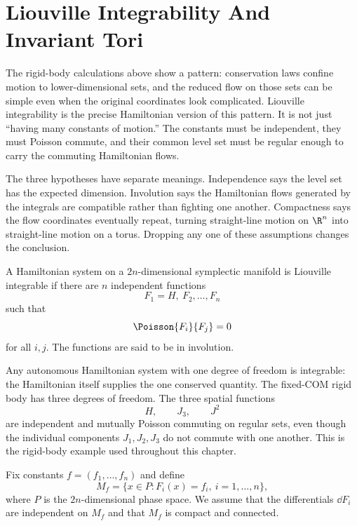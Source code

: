 \section{Liouville Integrability And Invariant Tori}
\label{sec:liouville-tori}

The rigid-body calculations above show a pattern: conservation laws confine
motion to lower-dimensional sets, and the reduced flow on those sets can be
simple even when the original coordinates look complicated. Liouville
integrability is the precise Hamiltonian version of this pattern. It is not
just ``having many constants of motion.'' The constants must be independent,
they must Poisson commute, and their common level set must be regular enough to
carry the commuting Hamiltonian flows.

The three hypotheses have separate meanings. Independence says the level set
has the expected dimension. Involution says the Hamiltonian flows generated by
the integrals are compatible rather than fighting one another. Compactness says
the flow coordinates eventually repeat, turning straight-line motion on
\(\R^n\) into straight-line motion on a torus. Dropping any one of these
assumptions changes the conclusion.

\begin{definition}
A Hamiltonian system on a \(2n\)-dimensional symplectic manifold is Liouville
integrable if there are \(n\) independent functions
\[
  F_1=H,\ F_2,\ldots,F_n
\]
such that
\[
  \Poisson{F_i}{F_j}=0
\]
for all \(i,j\). The functions are said to be in involution.
\end{definition}

\begin{example}
Any autonomous Hamiltonian system with one degree of freedom is integrable: the
Hamiltonian itself supplies the one conserved quantity. The fixed-COM rigid body
has three degrees of freedom. The three spatial functions
\[
  H,\qquad J_3,\qquad J^2
\]
are independent and mutually Poisson commuting on regular sets, even though the
individual components \(J_1,J_2,J_3\) do not commute with one another. This is
the rigid-body example used throughout this chapter.
\end{example}

\begin{assumption}
Fix constants \(f=(f_1,\ldots,f_n)\) and define
\[
  M_f=\{x\in P: F_i(x)=f_i,\ i=1,\ldots,n\},
\]
where \(P\) is the \(2n\)-dimensional phase space. We assume that the
differentials \(\dd F_i\) are independent on \(M_f\) and that \(M_f\) is
compact and connected.
\end{assumption}

